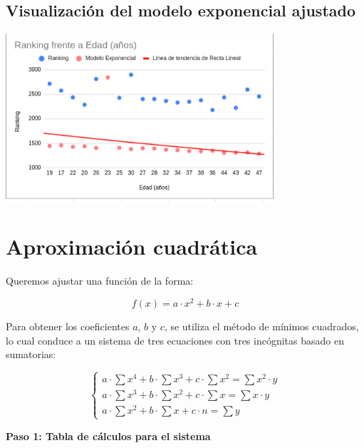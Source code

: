 \documentclass[12pt]{article}
\begin{document}
\vspace{1cm}
\subsection*{Visualización del modelo exponencial ajustado}

\vspace{0.5cm}

\begin{center}
    \includegraphics[width=0.75\textwidth]{nubeExponencial.png}
\end{center}




\newpage
\section*{Aproximación cuadrática}

Queremos ajustar una función de la forma:

\[
f(x) = a \cdot x^2 + b \cdot x + c
\]

Para obtener los coeficientes \( a \), \( b \) y \( c \), se utiliza el método de mínimos cuadrados, lo cual conduce a un sistema de tres ecuaciones con tres incógnitas basado en sumatorias:

\[
\left\{
\begin{array}{l}
a \cdot \sum x^4 + b \cdot \sum x^3 + c \cdot \sum x^2 = \sum x^2 \cdot y \\
a \cdot \sum x^3 + b \cdot \sum x^2 + c \cdot \sum x = \sum x \cdot y \\
a \cdot \sum x^2 + b \cdot \sum x + c \cdot n = \sum y
\end{array}
\right.
\]

\vspace{0.5cm}
\textbf{Paso 1: Tabla de cálculos para el sistema}
\end{document}
